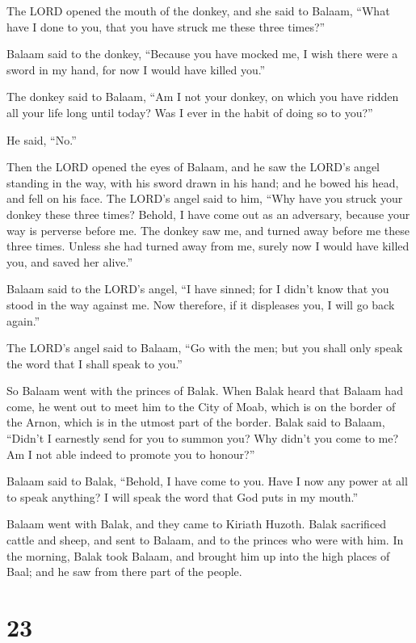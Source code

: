  The LORD opened the mouth of the donkey, and she said to
Balaam, ``What have I done to you, that you have struck me these three
times?''

 Balaam said to the donkey, ``Because you have mocked me, I
wish there were a sword in my hand, for now I would have killed you.''

 The donkey said to Balaam, ``Am I not your donkey, on
which you have ridden all your life long until today? Was I ever in the
habit of doing so to you?''

He said, ``No.''

 Then the LORD opened the eyes of Balaam, and he saw the
LORD's angel standing in the way, with his sword drawn in his hand; and
he bowed his head, and fell on his face.  The LORD's angel
said to him, ``Why have you struck your donkey these three times?
Behold, I have come out as an adversary, because your way is perverse
before me.  The donkey saw me, and turned away before me
these three times. Unless she had turned away from me, surely now I
would have killed you, and saved her alive.''

 Balaam said to the LORD's angel, ``I have sinned; for I
didn't know that you stood in the way against me. Now therefore, if it
displeases you, I will go back again.''

 The LORD's angel said to Balaam, ``Go with the men; but
you shall only speak the word that I shall speak to you.''

So Balaam went with the princes of Balak.  When Balak heard
that Balaam had come, he went out to meet him to the City of Moab, which
is on the border of the Arnon, which is in the utmost part of the
border.  Balak said to Balaam, ``Didn't I earnestly send
for you to summon you? Why didn't you come to me? Am I not able indeed
to promote you to honour?''

 Balaam said to Balak, ``Behold, I have come to you. Have I
now any power at all to speak anything? I will speak the word that God
puts in my mouth.''

 Balaam went with Balak, and they came to Kiriath Huzoth.
 Balak sacrificed cattle and sheep, and sent to Balaam, and
to the princes who were with him.  In the morning, Balak
took Balaam, and brought him up into the high places of Baal; and he saw
from there part of the people.

\hypertarget{section-22}{%
\section{23}\label{section-22}}


